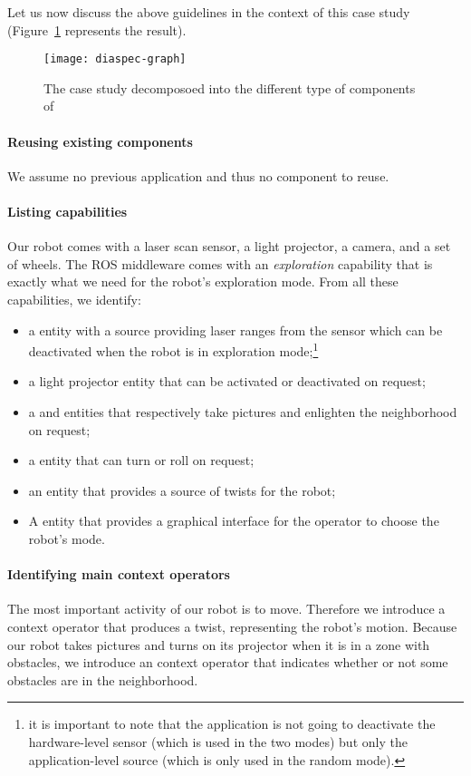 Let us now discuss the above guidelines in the context of this case
study (Figure~\ref{fig:diaspec-graph} represents the result).

\begin{figure}
  \centering
  \texttt{[image: diaspec-graph]}
  \caption{The case study decomposoed into the different type of
    components of \diaspec{}}
\label{fig:diaspec-graph}
\end{figure}

\paragraph*{Reusing existing components}
We assume no previous \diaspec{} application and thus no \diaspec{}
component to reuse.

\paragraph*{Listing capabilities}
Our robot comes with a laser scan sensor, a light projector, a camera,
and a set of wheels. The ROS middleware comes with an
\emph{exploration} capability that is exactly what we need for the
robot's exploration mode. From all these capabilities, we identify:
\begin{itemize}
\item a  entity with a  source providing laser
  ranges from the sensor which can be deactivated when the robot is in
  exploration mode;\footnote{it is important to note that the
    application is not going to deactivate the hardware-level sensor
    (which is used in the two modes) but only the application-level
    source (which is only used in the random mode).}
\item a light projector entity that can be activated or deactivated on
  request;
\item a  and  entities that respectively take
  pictures and enlighten the neighborhood on request;
\item a  entity that can turn or roll on request;
\item an  entity that provides a source of twists for
  the robot;
\item A  entity that provides a graphical interface
  for the operator to choose the robot's mode.
\end{itemize}

\paragraph*{Identifying main context operators}
The most important activity of our robot is to move. Therefore we
introduce a  context operator that produces a twist,
representing the robot's motion. Because our robot takes pictures and
turns on its projector when it is in a zone with obstacles, we
introduce an  context operator that indicates whether
or not some obstacles are in the neighborhood.

